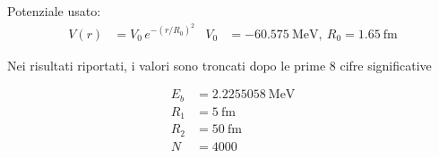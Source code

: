 \documentclass[12pt,a4paper]{article}
\begin{document}
Potenziale usato:
\begin{align*}
    V(r) &= V_0\,e^{-\left(r/R_0\right)^2} & V_0 &=-60.575\ \mathrm{MeV},\ R_0 = 1.65\ \mathrm{fm}
\end{align*}

Nei risultati riportati, i valori sono troncati dopo le prime 8 cifre significative

\vspace{2em}

\begin{figure}[htb]
    \centering
    \begin{subfigure}{.65\textwidth}
        \centering
    \end{subfigure}%
    \begin{subfigure}{.35\textwidth}
        \centering
        \begin{align*}
            E_b &=2.2255058\ \mathrm{MeV}\\
            R_1 &=5\ \mathrm{fm}\\
            R_2 &=50\ \mathrm{fm}\\
            N &=4000
        \end{align*}
    \end{subfigure}
\end{figure}

\vspace{2em}
\end{document}
